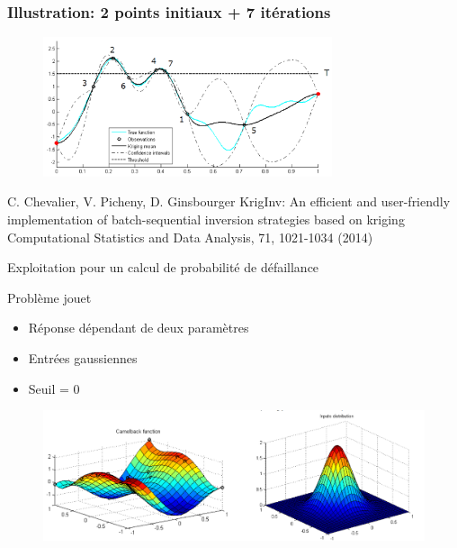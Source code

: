 {
\frametitle{Illustration: 2 points initiaux + 7 itérations}
\begin{figure}
  \centering
  \includegraphics[width=85mm]{figT/illustOptIMSET.png}
\end{figure}

\scriptsize{
 \begin{thebibliography}{1}
\beamertemplatearticlebibitems
     C. Chevalier, V. Picheny, D. Ginsbourger
         \newblock KrigInv: An efficient and user-friendly implementation of batch-sequential inversion strategies based on kriging
         \newblock Computational Statistics and Data Analysis, 71, 1021-1034 (2014)
 \end{thebibliography}
}

}
\begin{frame}{Exploitation pour un calcul de probabilité de défaillance}
\begin{block}{Problème jouet}
 \begin{itemize}
  \item Réponse dépendant de deux paramètres
  \item Entrées gaussiennes
  \item Seuil = 0
 \end{itemize}
\end{block}

\begin{figure} 
\centering
\includegraphics[width=\textwidth]{figT/branin.png} 
\end{figure}

\end{frame}
